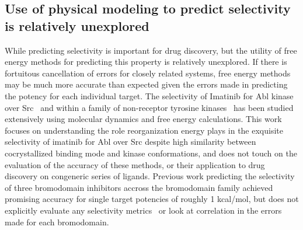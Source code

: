 \documentclass[phd,tocprelim]{cornell}
\begin{document}
\subsection{Use of physical modeling to predict selectivity is relatively unexplored}
While predicting selectivity is important for drug discovery, but the utility of free energy methods for predicting this property is relatively unexplored. If there is fortuitous cancellation of errors for closely related systems, free energy methods may be much more accurate than expected given the errors made in predicting the potency for each individual target. The selectivity of Imatinib for Abl kinase over Src~\citep{Lin2013-ft,Lin2014-iv} and within a family of non-receptor tyrosine kinases~\citep{Lin2013-mu} has been studied extensively using molecular dynamics and free energy calculations. This work focuses on understanding the role reorganization energy plays in the exquisite selectivity of imatinib for Abl over Src despite high similarity between cocrystallized binding mode and kinase conformations, and does not touch on the evaluation of the accuracy of these methods, or their application to drug discovery on congeneric series of ligands. Previous work predicting the selectivity of three bromodomain inhibitors accross the bromodomain family achieved promising accuracy for single target potencies of roughly 1 kcal/mol, but does not explicitly evaluate any selectivity metrics~\citep{Aldeghi2017-ox} or look at correlation in the errors made for each bromodomain. 
\end{document}
